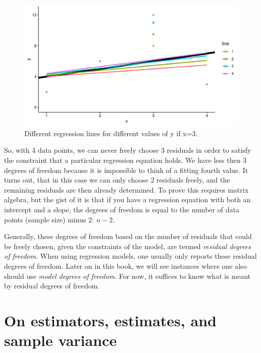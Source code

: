 \documentclass[]{book}\usepackage[]{graphicx}\usepackage[]{color}
\makeatletter
\def\maxwidth{ %
  \ifdim\Gin@nat@width>\linewidth
    \linewidth
  \else
    \Gin@nat@width
  \fi
}
\newenvironment{knitrout}{}{} %
\makeatother
\begin{document}
\begin{knitrout}
\color{fgcolor}\begin{figure}

{\centering \includegraphics[width=\maxwidth]{figure/inf_13-1} 

}

\caption[Different regression lines for different values of y if x=3]{Different regression lines for different values of y if x=3.}\label{fig:inf_13}
\end{figure}


\end{knitrout}

So, with 4 data points, we can never freely choose 3 residuals in order to satisfy the constraint that a particular regression equation holds. We have less then 3 degrees of freedom because it is impossible to think of a fitting fourth value. It turns out, that in this case we can only choose 2 residuals freely, and the remaining residuals are then already determined. To prove this requires matrix algebra, but the gist of it is that if you have a regression equation with both an intercept and a slope, the degrees of freedom is equal to the number of data points (sample size) minus 2: $n-2$.

Generally, these degrees of freedom based on the number of residuals that could be freely chosen, given the constraints of the model, are termed \textit{residual degrees of freedom}. When using regression models, one usually only reports these residual degrees of freedom. Later on in this book, we will see instances where one also should use \textit{model degrees of freedom}. For now, it suffices to know what is meant by residual degrees of freedom.

\section{On estimators, estimates, and sample variance}
\end{document}

